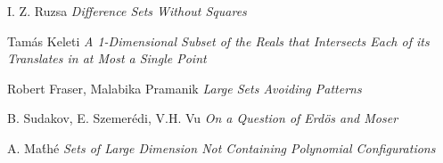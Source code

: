 \documentclass{article}
\theoremstyle{plain}
\theoremstyle{plain}
\begin{document}
\begin{thebibliography}{9}

I. Z. Ruzsa
\textit{Difference Sets Without Squares}

Tam\'{a}s Keleti
\textit{A 1-Dimensional Subset of the Reals that Intersects Each of its Translates in at Most a Single Point}

Robert Fraser, Malabika Pramanik
\textit{Large Sets Avoiding Patterns}

B. Sudakov, E. Szemer\'{e}di, V.H. Vu
\textit{On a Question of Erd\"{o}s and Moser}

A. Ma\'{t}h\'{e}
\textit{Sets of Large Dimension Not Containing Polynomial Configurations}

\end{thebibliography}


\end{document}
